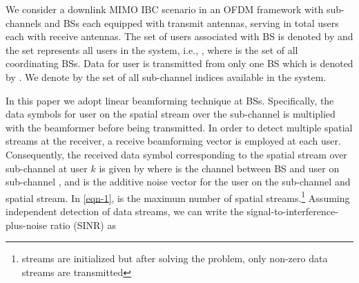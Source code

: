 We consider a downlink \ac{MIMO} \ac{IBC} scenario in an \ac{OFDM} framework with  sub-channels and  \acp{BS} each equipped with  transmit antennas, serving in total  users each with  receive antennas. The set of users associated with \ac{BS}  is denoted by  and the set  represents all users in the system, i.e., , where  is the set of all coordinating \acp{BS}. Data for user  is transmitted from only one \ac{BS} which is denoted by . We denote by  the set of all sub-channel indices available in the system.

In this paper we adopt linear beamforming technique at \acp{BS}. Specifically, the data symbols  for  user  on the  spatial stream over the sub-channel  is multiplied with the beamformer  before being transmitted. In order to detect  multiple spatial streams at the receiver, a receive beamforming vector  is employed at each user. Consequently, the received data symbol corresponding to the  spatial stream over sub-channel  at user $k$ is given by
\iftoggle{single_column}{
\begin{equation}\label{eqn-1}
\hat{d}_{l,k,n} = \mvec{w}{l,k,n}^\herm \mvec{H}{b_k,k,n} \,\mvec{m}{l,k,n} d_{l,k,n} + \mvec{w}{l,k,n}^\herm \sum_{i \in \mc{U} \backslash \set{k}} \mvec{H}{b_i,k,n} \sum_{j = 1}^L \mvec{m}{j,i,n}d_{j,i,n} + \mvec{w}{l,k,n}^\herm \mvec{n}{k,n}
\end{equation}
}{
\begin{multline}\label{eqn-1}
\hat{d}_{l,k,n} = \mvec{w}{l,k,n}^\herm \mvec{H}{b_k,k,n} \,\mvec{m}{l,k,n} d_{l,k,n} + \mvec{w}{l,k,n}^\herm \mvec{n}{k,n} \\ 
+ \mvec{w}{l,k,n}^\herm \sum_{i \in \mc{U} \backslash \set{k}} \mvec{H}{b_i,k,n} \sum_{j = 1}^L \mvec{m}{j,i,n}d_{j,i,n}
\end{multline}
}
where  is the channel between \ac{BS}  and  user  on sub-channel , and   is the additive noise vector for the user  on the  sub-channel and  spatial stream. In \eqref{eqn-1},  is the maximum number of spatial streams.\footnote{ streams are initialized but after solving the problem, only  non-zero data streams are transmitted} Assuming independent detection of data streams, we can write the signal-to-interference-plus-noise ratio (SINR) as

